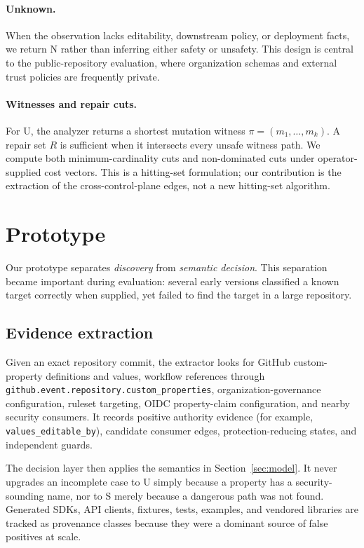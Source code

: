 \documentclass[sigconf,review,anonymous]{acmart}
\newcommand{\U}{\textsf{U}}
\newcommand{\Ssafe}{\textsf{S}}
\newcommand{\N}{\textsf{N}}
\begin{document}
\paragraph{Unknown.}
When the observation lacks editability, downstream policy, or deployment facts,
we return \N{} rather than inferring either safety or unsafety.  This design is
central to the public-repository evaluation, where organization schemas and
external trust policies are frequently private.

\paragraph{Witnesses and repair cuts.}
For \U{}, the analyzer returns a shortest mutation witness
$\pi=(m_1,\ldots,m_k)$.  A repair set $R$ is sufficient when it intersects every
unsafe witness path.  We compute both minimum-cardinality cuts and non-dominated
cuts under operator-supplied cost vectors.  This is a hitting-set formulation;
our contribution is the extraction of the cross-control-plane edges, not a new
hitting-set algorithm.

\section{Prototype}

Our prototype separates \emph{discovery} from
\emph{semantic decision}.  This separation became important during evaluation:
several early versions classified a known target correctly when supplied, yet
failed to find the target in a large repository.

\subsection{Evidence extraction}

Given an exact repository commit, the extractor looks for GitHub custom-property
definitions and values, workflow references through
\nolinkurl{github.event.repository.custom_properties}, organization-governance
configuration, ruleset targeting, OIDC property-claim configuration, and nearby
security consumers.  It records positive authority evidence (for example,
\nolinkurl{values_editable_by}), candidate consumer edges, protection-reducing
states, and independent guards.

The decision layer then applies the semantics in Section~\ref{sec:model}.  It
never upgrades an incomplete case to \U{} simply because a property has a
security-sounding name, nor to \Ssafe{} merely because a dangerous path was not
found.  Generated SDKs, API clients, fixtures, tests, examples, and vendored
libraries are tracked as provenance classes because they were a dominant source
of false positives at scale.
\end{document}
